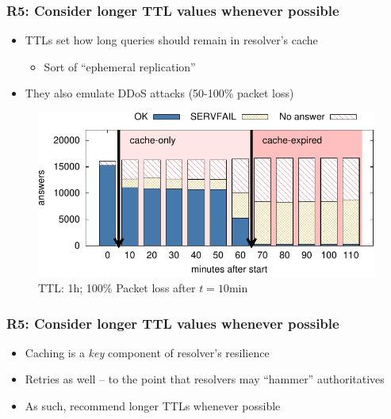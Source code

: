\documentclass[11pt,show 
notes,notheorems,noamsthm,blank]{beamer} %
\begin{document}
\begin{frame}
 \frametitle{R5: Consider longer TTL values whenever 
possible}
\begin{itemize}
 \item TTLs set how long queries should remain in resolver's cache
\begin{itemize}
   \item Sort of ``ephemeral replication''
\end{itemize}

 \item They also emulate DDoS attacks (50-100\% packet loss)

 
\end{itemize}


\begin{figure}
\centering
\includegraphics[width=0.7\columnwidth]{fig/hist.pdf}
 \caption{TTL: 1h; 100\%  Packet loss after $t=10$min}
\label{fig:class-valid-queries}
\end{figure}

\end{frame}


\begin{frame}
 \frametitle{R5: Consider longer TTL values whenever 
possible}
\begin{itemize}
 
 
 \item Caching is a \textit{key} component of resolver's resilience
   \item Retries as well -- to the point that resolvers may ``hammer'' 
authoritatives
   
   
 \item As such, \cite{Moura18b} recommend longer TTLs whenever possible
 
 
 \end{itemize}
 
 
\end{frame}
\end{document}
